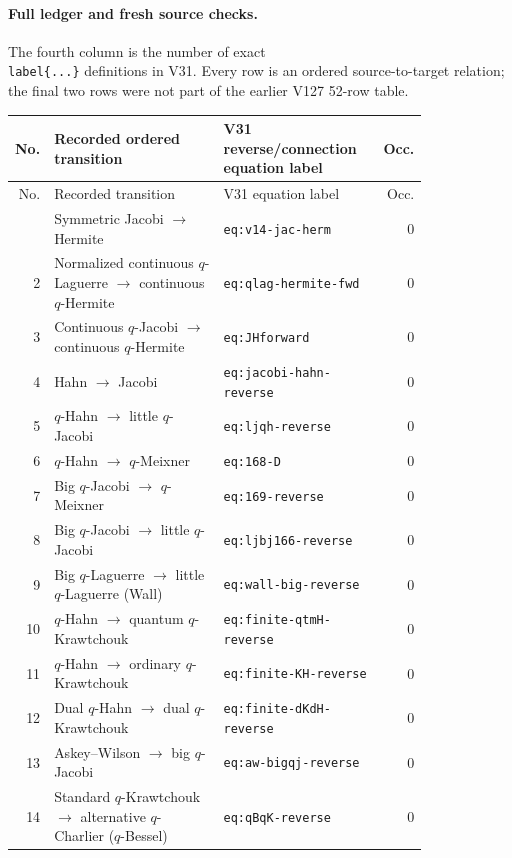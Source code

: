 \documentclass[11pt]{article}
\begin{document}
\paragraph{Full ledger and fresh source checks.} The fourth column is the number of exact \texttt{\\label\{...\}} definitions in V31. Every row is an ordered source-to-target relation; the final two rows were not part of the earlier V127 52-row table.
\begingroup\scriptsize
\begin{longtable}{@{}r p{0.43\linewidth} p{0.39\linewidth} r@{}}
\toprule No. & Recorded ordered transition & V31 reverse/connection equation label & Occ.\\
\midrule\endfirsthead
\toprule No. & Recorded transition & V31 equation label & Occ.\\
\midrule\endhead
\bottomrule\endfoot
1 & Symmetric Jacobi $\ensuremath{\to}$ Hermite & \texttt{eq:v14-jac-herm} & 0 \\
2 & Normalized continuous $q$-Laguerre $\ensuremath{\to}$ continuous $q$-Hermite & \texttt{eq:qlag-hermite-fwd} & 0 \\
3 & Continuous $q$-Jacobi $\ensuremath{\to}$ continuous $q$-Hermite & \texttt{eq:JHforward} & 0 \\
4 & Hahn $\ensuremath{\to}$ Jacobi & \texttt{eq:jacobi-hahn-reverse} & 0 \\
5 & $q$-Hahn $\ensuremath{\to}$ little $q$-Jacobi & \texttt{eq:ljqh-reverse} & 0 \\
6 & $q$-Hahn $\ensuremath{\to}$ $q$-Meixner & \texttt{eq:168-D} & 0 \\
7 & Big $q$-Jacobi $\ensuremath{\to}$ $q$-Meixner & \texttt{eq:169-reverse} & 0 \\
8 & Big $q$-Jacobi $\ensuremath{\to}$ little $q$-Jacobi & \texttt{eq:ljbj166-reverse} & 0 \\
9 & Big $q$-Laguerre $\ensuremath{\to}$ little $q$-Laguerre (Wall) & \texttt{eq:wall-big-reverse} & 0 \\
10 & $q$-Hahn $\ensuremath{\to}$ quantum $q$-Krawtchouk & \texttt{eq:finite-qtmH-reverse} & 0 \\
11 & $q$-Hahn $\ensuremath{\to}$ ordinary $q$-Krawtchouk & \texttt{eq:finite-KH-reverse} & 0 \\
12 & Dual $q$-Hahn $\ensuremath{\to}$ dual $q$-Krawtchouk & \texttt{eq:finite-dKdH-reverse} & 0 \\
13 & Askey--Wilson $\ensuremath{\to}$ big $q$-Jacobi & \texttt{eq:aw-bigqj-reverse} & 0 \\
14 & Standard $q$-Krawtchouk $\ensuremath{\to}$ alternative $q$-Charlier ($q$-Bessel) & \texttt{eq:qBqK-reverse} & 0 \\

\end{longtable}
\end{document}

